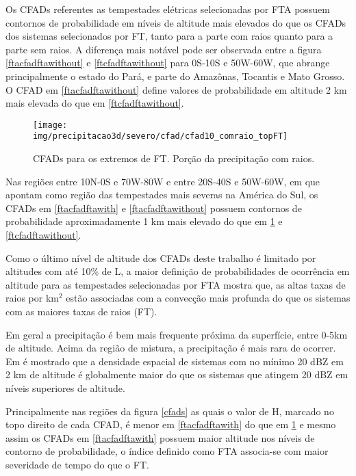 Os CFADs referentes as tempestades elétricas selecionadas por FTA possuem contornos de probabilidade em níveis de altitude mais elevados do que os CFADs dos sistemas selecionados por FT, tanto para a parte com raios quanto para a parte sem raios. A diferença mais notável pode ser observada entre a figura \ref{ftacfadftawithout} e \ref{ftcfadftawithout} para 0S-10S e 50W-60W, que abrange principalmente o estado do Pará, e parte do Amazônas, Tocantis e Mato Grosso. O CFAD em \ref{ftacfadftawithout} define valores de probabilidade em altitude 2 km mais elevada do que em \ref{ftcfadftawithout}.

\begin{figure}[!ht]
  \centering
  \texttt{[image: img/precipitacao3d/severo/cfad/cfad10\_comraio\_topFT]}
  \caption{CFADs para os extremos de FT. Porção da precipitação com raios.}
  \label{ftcfadftawith}   
\end{figure} 



Nas regiões entre 10N-0S e 70W-80W e entre 20S-40S e 50W-60W, em que \cite{cecil2005} apontam como região das tempestades mais severas na América do Sul, os CFADs em \ref{ftacfadftawith} e \ref{ftacfadftawithout} possuem contornos de probabilidade aproximadamente 1 km mais elevado do que em \ref{ftcfadftawith} e \ref{ftcfadftawithout}.

Como o último nível de altitude dos CFADs deste trabalho é limitado por altitudes com até 10\% de L, a maior definição de probabilidades de ocorrência em altitude para as tempestades selecionadas por FTA mostra que, as altas taxas de raios por km$^2$ estão associadas com a convecção mais profunda do que os sistemas com as maiores taxas de raios (FT).






Em geral a precipitação é bem mais frequente próxima da superfície, entre 0-5km de altitude. Acima da região de mistura, a precipitação é mais rara de ocorrer. Em \cite{liu2008} é mostrado que a densidade espacial de sistemas com no mínimo 20 dBZ em 2 km de altitude é globalmente maior do que os sistemas que atingem 20 dBZ em níveis superiores de altitude.

Principalmente nas regiões da figura \ref{cfads} as quais o valor de H, marcado no topo direito de cada CFAD, é menor em \ref{ftacfadftawith} do que em \ref{ftcfadftawith} e mesmo assim os CFADs em \ref{ftacfadftawith} possuem maior altitude nos níveis de contorno de probabilidade, o índice definido como FTA associa-se com maior severidade de tempo do que o FT. 

